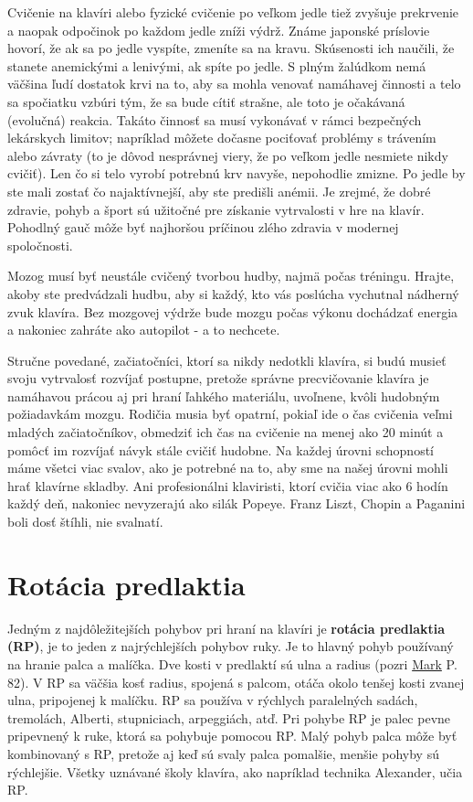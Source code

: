 \documentclass[11pt,a4paper]{book}
\begin{document}
Cvičenie na klavíri alebo fyzické cvičenie po veľkom jedle tiež zvyšuje prekrvenie a naopak odpočinok po každom jedle zníži výdrž. Známe japonské príslovie hovorí, že ak sa po jedle vyspíte, zmeníte sa na kravu. Skúsenosti ich naučili, že stanete anemickými a lenivými, ak spíte po jedle. S plným žalúdkom nemá väčšina ľudí dostatok krvi na to, aby sa mohla venovať namáhavej činnosti a telo sa spočiatku vzbúri tým, že sa bude cítiť strašne, ale toto je očakávaná (evolučná) reakcia. Takáto činnosť sa musí vykonávať v rámci bezpečných lekárskych limitov; napríklad môžete dočasne pociťovať problémy s trávením alebo závraty (to je dôvod nesprávnej viery, že po veľkom jedle nesmiete nikdy cvičiť). Len čo si telo vyrobí potrebnú krv navyše, nepohodlie zmizne. Po jedle by ste mali zostať čo najaktívnejší, aby ste predišli anémii. Je zrejmé, že dobré zdravie, pohyb a šport sú užitočné pre získanie vytrvalosti v hre na klavír. Pohodlný gauč môže byť najhoršou príčinou zlého zdravia v modernej spoločnosti.

Mozog musí byť neustále cvičený tvorbou hudby, najmä počas tréningu. Hrajte, akoby ste predvádzali hudbu, aby si každý, kto vás poslúcha vychutnal nádherný zvuk klavíra. Bez mozgovej výdrže bude mozgu počas výkonu dochádzať energia a nakoniec zahráte ako autopilot - a to nechcete.

Stručne povedané, začiatočníci, ktorí sa nikdy nedotkli klavíra, si budú musieť svoju vytrvalosť rozvíjať postupne, pretože správne precvičovanie klavíra je namáhavou prácou aj pri hraní ľahkého materiálu, uvoľnene, kvôli hudobným požiadavkám mozgu. Rodičia musia byť opatrní, pokiaľ ide o čas cvičenia veľmi mladých začiatočníkov, obmedziť ich čas na cvičenie na menej ako 20 minút a pomôcť im rozvíjať návyk stále cvičiť hudobne. Na každej úrovni schopností máme všetci viac svalov, ako je potrebné na to, aby sme na našej úrovni mohli hrať klavírne skladby. Ani profesionálni klaviristi, ktorí cvičia viac ako 6 hodín každý deň, nakoniec nevyzerajú ako silák Popeye. Franz Liszt, Chopin a Paganini boli dosť štíhli, nie svalnatí.

\section{Rotácia predlaktia}\label{s:forearm-rotation}
Jedným z najdôležitejších pohybov pri hraní na klavíri je \textbf{rotácia predlaktia (RP)}, je to jeden z najrýchlejších pohybov ruky. Je to hlavný pohyb používaný na hranie palca a malíčka. Dve kosti v predlaktí sú ulna a radius (pozri \hyperlink{r:mark}{Mark} P. 82). V RP sa väčšia kosť radius, spojená s palcom, otáča okolo tenšej kosti zvanej ulna, pripojenej k malíčku. RP sa používa v rýchlych paralelných sadách, tremolách, Alberti, stupniciach, arpeggiách, atď. Pri pohybe RP je palec pevne pripevnený k ruke, ktorá sa pohybuje pomocou RP. Malý pohyb palca môže byť kombinovaný s RP, pretože aj keď sú svaly palca pomalšie, menšie pohyby sú rýchlejšie. Všetky uznávané školy klavíra, ako napríklad technika Alexander, učia RP. 
\end{document}
